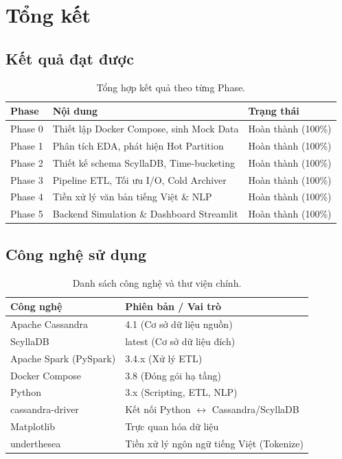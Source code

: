 \documentclass[12pt,a4paper]{article}
\begin{document}
\newpage
\section{Tổng kết}

\subsection{Kết quả đạt được}

\begin{table}[H]
\centering
\caption{Tổng hợp kết quả theo từng Phase.}
\label{tab:summary}
\begin{tabular}{lll}
\toprule
\textbf{Phase} & \textbf{Nội dung} & \textbf{Trạng thái} \\
\midrule
Phase 0 & Thiết lập Docker Compose, sinh Mock Data & Hoàn thành (100\%) \\
Phase 1 & Phân tích EDA, phát hiện Hot Partition & Hoàn thành (100\%) \\
Phase 2 & Thiết kế schema ScyllaDB, Time-bucketing & Hoàn thành (100\%) \\
Phase 3 & Pipeline ETL, Tối ưu I/O, Cold Archiver & Hoàn thành (100\%) \\
Phase 4 & Tiền xử lý văn bản tiếng Việt \& NLP & Hoàn thành (100\%) \\
Phase 5 & Backend Simulation \& Dashboard Streamlit & Hoàn thành (100\%) \\
\bottomrule
\end{tabular}
\end{table}

\subsection{Công nghệ sử dụng}

\begin{table}[H]
\centering
\caption{Danh sách công nghệ và thư viện chính.}
\label{tab:tech}
\begin{tabular}{ll}
\toprule
\textbf{Công nghệ} & \textbf{Phiên bản / Vai trò} \\
\midrule
Apache Cassandra & 4.1 (Cơ sở dữ liệu nguồn) \\
ScyllaDB & latest (Cơ sở dữ liệu đích) \\
Apache Spark (PySpark) & 3.4.x (Xử lý ETL) \\
Docker Compose & 3.8 (Đóng gói hạ tầng) \\
Python & 3.x (Scripting, ETL, NLP) \\
cassandra-driver & Kết nối Python $\leftrightarrow$ Cassandra/ScyllaDB \\
Matplotlib & Trực quan hóa dữ liệu \\
underthesea & Tiền xử lý ngôn ngữ tiếng Việt (Tokenize) \\
\bottomrule
\end{tabular}
\end{table}
\end{document}
